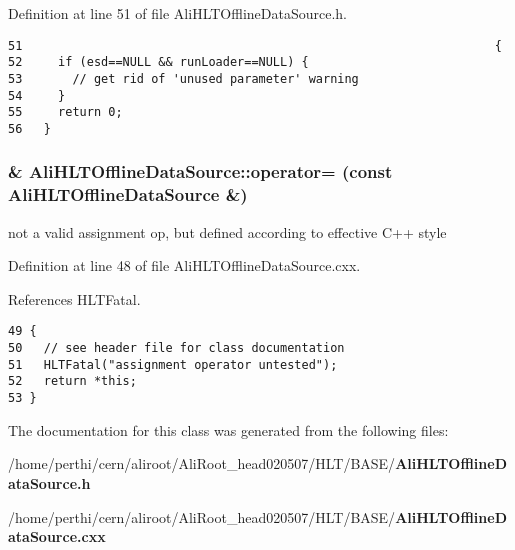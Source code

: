 Definition at line 51 of file Ali\-HLTOffline\-Data\-Source.h.

\footnotesize\begin{verbatim}51                                                                  {
52     if (esd==NULL && runLoader==NULL) {
53       // get rid of 'unused parameter' warning
54     }
55     return 0;
56   }
\end{verbatim}\normalsize 


\subsubsection{ \& Ali\-HLTOffline\-Data\-Source::operator= (const {\bf Ali\-HLTOffline\-Data\-Source} \&)}\label{classAliHLTOfflineDataSource_a2}


not a valid assignment op, but defined according to effective C++ style 

Definition at line 48 of file Ali\-HLTOffline\-Data\-Source.cxx.

References HLTFatal.

\footnotesize\begin{verbatim}49 { 
50   // see header file for class documentation
51   HLTFatal("assignment operator untested");
52   return *this;
53 }
\end{verbatim}\normalsize 




The documentation for this class was generated from the following files:\begin{CompactItemize}
\item 
/home/perthi/cern/aliroot/Ali\-Root\_\-head020507/HLT/BASE/{\bf Ali\-HLTOffline\-Data\-Source.h}\item 
/home/perthi/cern/aliroot/Ali\-Root\_\-head020507/HLT/BASE/{\bf Ali\-HLTOffline\-Data\-Source.cxx}\end{CompactItemize}
